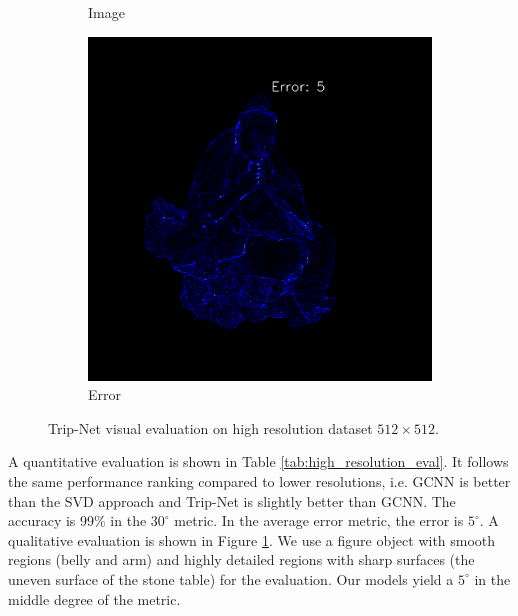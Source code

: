 \begin{figure}[th]
\begin{subfigure}[b]{0.32\linewidth}
		\caption{Image}
	\end{subfigure}
	\begin{subfigure}[b]{0.32\linewidth}
		\includegraphics[width=\linewidth]{./Figures/comparison_512/fancy_eval_11_error_Trip-Net-512.png}
		\caption{Error}
	\end{subfigure}
	
	\decoRule
	\caption{Trip-Net visual evaluation on high resolution dataset $ 512 \times 512 $.}
	\label{fig:trip-eval-high-resolution}
\end{figure}







A quantitative evaluation is shown in Table \ref{tab:high_resolution_eval}. It follows the same performance ranking compared to lower resolutions, i.e. GCNN is better than the SVD approach and Trip-Net is slightly better than GCNN. The accuracy is 99\% in the $30^\circ $ metric. In the average error metric, the error is $ 5^\circ $.  A qualitative evaluation is shown in Figure \ref{fig:trip-eval-high-resolution}. We use a figure object with smooth regions (belly and arm) and highly detailed regions with sharp surfaces (the uneven surface of the stone table) for the evaluation. Our models yield a $ 5^\circ $ in the middle degree of the metric. 

